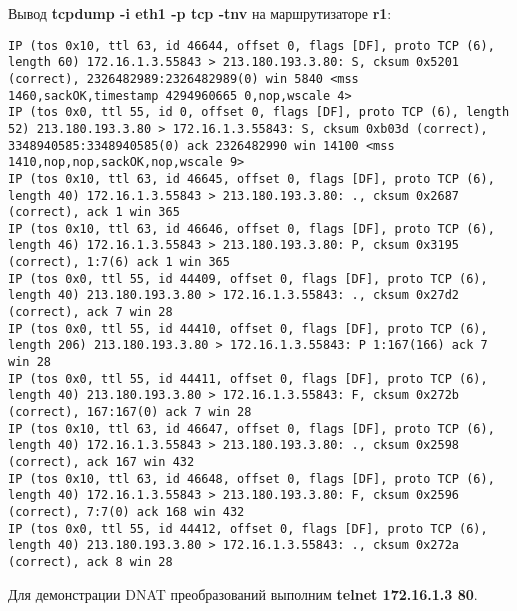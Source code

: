 \documentclass[a4paper,12pt]{article}
\begin{document}
Вывод \textbf{tcpdump -i eth1 -p tcp -tnv}  на маршрутизаторе \textbf{r1}:
\begin{Verbatim}
IP (tos 0x10, ttl 63, id 46644, offset 0, flags [DF], proto TCP (6), length 60) 172.16.1.3.55843 > 213.180.193.3.80: S, cksum 0x5201 (correct), 2326482989:2326482989(0) win 5840 <mss 1460,sackOK,timestamp 4294960665 0,nop,wscale 4>
IP (tos 0x0, ttl 55, id 0, offset 0, flags [DF], proto TCP (6), length 52) 213.180.193.3.80 > 172.16.1.3.55843: S, cksum 0xb03d (correct), 3348940585:3348940585(0) ack 2326482990 win 14100 <mss 1410,nop,nop,sackOK,nop,wscale 9>
IP (tos 0x10, ttl 63, id 46645, offset 0, flags [DF], proto TCP (6), length 40) 172.16.1.3.55843 > 213.180.193.3.80: ., cksum 0x2687 (correct), ack 1 win 365
IP (tos 0x10, ttl 63, id 46646, offset 0, flags [DF], proto TCP (6), length 46) 172.16.1.3.55843 > 213.180.193.3.80: P, cksum 0x3195 (correct), 1:7(6) ack 1 win 365
IP (tos 0x0, ttl 55, id 44409, offset 0, flags [DF], proto TCP (6), length 40) 213.180.193.3.80 > 172.16.1.3.55843: ., cksum 0x27d2 (correct), ack 7 win 28
IP (tos 0x0, ttl 55, id 44410, offset 0, flags [DF], proto TCP (6), length 206) 213.180.193.3.80 > 172.16.1.3.55843: P 1:167(166) ack 7 win 28
IP (tos 0x0, ttl 55, id 44411, offset 0, flags [DF], proto TCP (6), length 40) 213.180.193.3.80 > 172.16.1.3.55843: F, cksum 0x272b (correct), 167:167(0) ack 7 win 28
IP (tos 0x10, ttl 63, id 46647, offset 0, flags [DF], proto TCP (6), length 40) 172.16.1.3.55843 > 213.180.193.3.80: ., cksum 0x2598 (correct), ack 167 win 432
IP (tos 0x10, ttl 63, id 46648, offset 0, flags [DF], proto TCP (6), length 40) 172.16.1.3.55843 > 213.180.193.3.80: F, cksum 0x2596 (correct), 7:7(0) ack 168 win 432
IP (tos 0x0, ttl 55, id 44412, offset 0, flags [DF], proto TCP (6), length 40) 213.180.193.3.80 > 172.16.1.3.55843: ., cksum 0x272a (correct), ack 8 win 28
\end{Verbatim}

Для демонстрации DNAT преобразований выполним \textbf{telnet 172.16.1.3 80}.
\end{document}
